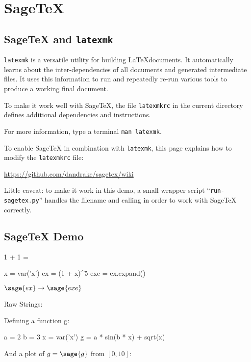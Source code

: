 \documentclass[master.tex]{subfiles}
\begin{document}
\chapter{SageTeX}
\label{sec:sagetex}


\section{SageTeX and \texttt{latexmk}}

\texttt{latexmk} is a versatile utility for building \LaTeX documents.
It automatically learns about the inter-dependencies of all
documents and generated intermediate files.
It uses this information to run and repeatedly re-run various tools 
to produce a working final document.

To make it work well with SageTeX,
the file \texttt{latexmkrc} in the current directory defines
additional dependencies and instructions.

For more information, type a terminal \texttt{man latexmk}.

To enable SageTeX in combination with \texttt{latexmk},
this page explains how to modify the \texttt{latexmkrc} file:

\url{https://github.com/dandrake/sagetex/wiki}

Little caveat: to make it work in this demo,
a small wrapper script ``\texttt{run-sagetex.py}''
handles the filename and calling in order to work with SageTeX
correctly.

\section{SageTeX Demo}

1 + 1 = 

\begin{sagesilent}
x = var('x')
ex = (1 + x)^5
exe = ex.expand()
\end{sagesilent}

$\sage{ex} \rightarrow \sage{exe}$

Raw Strings:


Defining a function g:

\begin{sageblock}
a = 2
b = 3
x = var('x')
g = a * sin(b * x) + sqrt(x)
\end{sageblock}

And a plot of $g = \sage{g}$ from $[0, 10]$:

\end{document}
